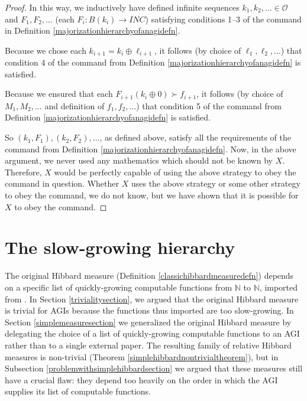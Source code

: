 \documentclass{article}
\begin{document}
\begin{proof}
    In this way, we inductively have defined infinite sequences
    $k_1,k_2,\ldots\in\mathcal O$ and $F_1,F_2,\ldots$ (each $F_i:B(k_i)\to INC$)
    satisfying conditions 1--3 of the command in
    Definition \ref{majorizationhierarchyofanagidefn}. 
    
    Because we chose each $k_{i+1}=k_i\oplus \ell_{i+1}$,
    it follows (by choice of $\ell_1,\ell_2,\ldots$) that condition 4 of the command from
    Definition \ref{majorizationhierarchyofanagidefn} is satisfied.
    
    Because we ensured that each $F_{i+1}(k_i\oplus 0)\succ f_{i+1}$,
    it follows (by choice of $M_1,M_2,\ldots$ and definition of $f_1,f_2,\ldots$)
    that condition 5 of the command from
    Definition \ref{majorizationhierarchyofanagidefn} is satisfied.

    So $(k_1,F_1),(k_2,F_2),\ldots$, as defined above, satisfy all the requirements
    of the command from Definition \ref{majorizationhierarchyofanagidefn}.
    Now, in the above argument, we never used any mathematics which should not be
    known by $X$. Therefore, $X$ would be perfectly capable of using the above
    strategy to obey the command in question. Whether $X$ uses the above strategy
    or some other strategy to obey the command, we do not know, but we have shown that
    it is possible for $X$ to obey the command.
\end{proof}


\section{The slow-growing hierarchy}
\label{slowgrowinghierarchysection}

The original Hibbard measure
(Definition \ref{classichibbardmeasuredefn}) depends on a specific list of
quickly-growing computable functions from $\mathbb N$ to $\mathbb N$, imported from
\cite{liu1960enumeration}. In Section \ref{trivialitysection}, we argued
that the original Hibbard measure is trivial for AGIs because the functions thus imported
are too slow-growing.
In Section \ref{simplemeasuresection} we generalized
the original Hibbard measure
by delegating the choice of a list of quickly-growing computable functions to an AGI rather
than to a single external paper. The resulting family of relative Hibbard measures is
non-trivial (Theorem \ref{simplehibbardnontrivialtheorem}), but in
Subsection \ref{problemwithsimplehibbardsection} we argued that these
measures still have a crucial flaw: they depend too heavily on the order in which
the AGI supplies its list of computable functions.
\end{document}
